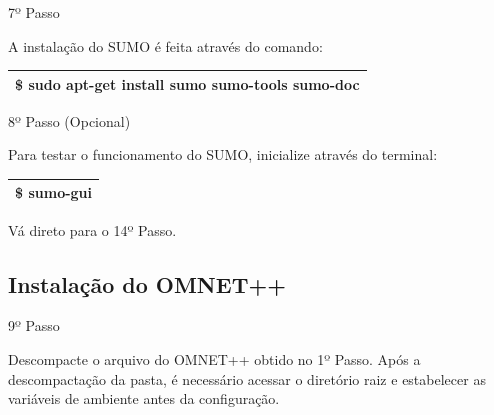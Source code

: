 \documentclass[
12pt,				%
openright,			%
oneside,			%
a4paper,			%
brazil,				%
]{abntex2}
\begin{document}
{\begin{anexosenv}
                	\begin{description}
		                \item[7º Passo]
		            \end{description}
		            \par A instalação do SUMO é feita através do comando:
		
		            \begin{table}[H]
			            \renewcommand{\arraystretch}{1.5}
		                \begin{tabular}{|p{15.5cm}|}
			                \hline
                            \$ sudo apt-get install sumo sumo-tools sumo-doc \\
			                \hline
			            \end{tabular}
		            \end{table}
                    
                    
                	\begin{description}
		                \item[8º Passo (Opcional)]
		            \end{description}
		            \par Para testar o funcionamento do SUMO, inicialize através do terminal:
		
		            \begin{table}[H]
			            \renewcommand{\arraystretch}{1.5}
		                \begin{tabular}{|p{15.5cm}|}
			                \hline
                            \$ sumo-gui \\
			                \hline
			            \end{tabular}
		            \end{table}
		            
		            \par Vá direto para o 14º Passo. %
                    
            	\subsection{Instalação do OMNET++}

                	\begin{description}
		                \item[9º Passo]
		            \end{description}
		            \par Descompacte o arquivo do OMNET++ obtido no 1º Passo. Após a descompactação da pasta, é necessário acessar o diretório raiz e estabelecer as variáveis de ambiente antes da configuração. %
		

\end{anexosenv}}
\end{document}
